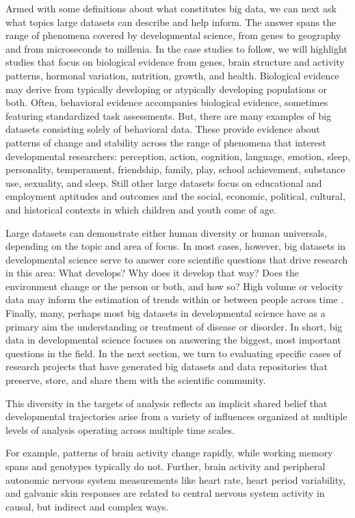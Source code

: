 Armed with some definitions about what constitutes big data, we can next ask what topics large datasets can describe and help inform.
The answer spans the range of phenomena covered by developmental science, from genes to geography and from microseconds to millenia.
In the case studies to follow, we will highlight studies that focus on biological evidence from genes, brain structure and activity patterns, hormonal variation, nutrition, growth, and health.
Biological evidence may derive from typically developing or atypically developing populations or both.
Often, behavioral evidence accompanies biological evidence, sometimes featuring standardized task assessments.
But, there are many examples of big datasets consisting solely of behavioral data.
These provide evidence about patterns of change and stability across the range of phenomena that interest developmental researchers: perception, action, cognition, language, emotion, sleep, personality, temperament, friendship, family, play, school achievement, substance use, sexuality, and sleep.
Still other large datasets focus on educational and employment aptitudes and outcomes and the social, economic, political, cultural, and historical contexts in which children and youth come of age.

Large datasets can demonstrate either human diversity or human universals, depending on the topic and area of focus.
In most cases, however, big datasets in developmental science serve to answer core scientific questions that drive research in this area: What develops? 
Why does it develop that way? 
Does the environment change or the person or both, and how so?
High volume or velocity data may inform the estimation of trends within or between people across time \cite{rietveld_replicability_2014}.
Finally, many, perhaps most big datasets in developmental science have as a primary aim the understanding or treatment of disease or disorder.
In short, big data in developmental science focuses on answering the biggest, most important questions in the field.
In the next section, we turn to evaluating specific cases of research projects that have generated big datasets and data repositories that preserve, store, and share them with the scientific community.

This diversity in the targets of analysis reflects an implicit shared belief that developmental trajectories arise from a variety of influences organized at multiple levels of analysis operating across multiple time scales.

For example, patterns of brain activity change rapidly, while working memory spans and genotypes typically do not.
Further, brain activity and peripheral autonomic nervous system measurements like heart rate, heart period variability, and galvanic skin responses are related to central nervous system activity in causal, but indirect and complex ways. 
